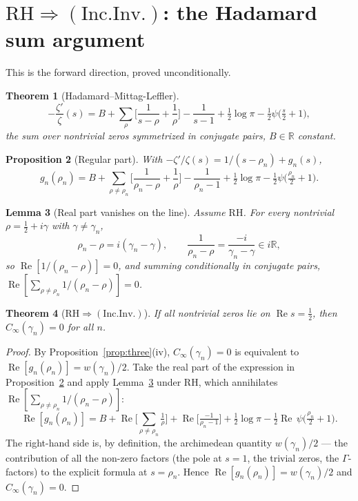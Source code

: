 \documentclass[11pt]{amsart}
\newtheorem{theorem}{Theorem}[section]
\newtheorem{proposition}[theorem]{Proposition}
\newtheorem{lemma}[theorem]{Lemma}
\theoremstyle{definition}
\theoremstyle{remark}
\newcommand{\RH}{\mathrm{RH}}
\renewcommand{\Re}{\operatorname{Re}}
\newcommand{\half}{\tfrac12}
\newcommand{\Cinf}{C_\infty}
\newcommand{\gamn}{\gamma_n}
\newcommand{\rhon}{\rho_n}
\newcommand{\incInv}{(\mathrm{Inc.Inv.})}
\newcommand{\psidig}{\psi}
\begin{document}
\section{$\RH\Rightarrow\incInv$: the Hadamard sum argument}\label{sec:hadamard}

This is the forward direction, proved unconditionally.

\begin{theorem}[Hadamard--Mittag-Leffler]\label{thm:had}
\[
-\frac{\zeta'}{\zeta}(s)=B+\sum_\rho\Big[\frac1{s-\rho}+\frac1\rho\Big]-\frac1{s-1}
+\tfrac12\log\pi-\tfrac12\psidig\!\big(\tfrac s2+1\big),
\]
the sum over nontrivial zeros symmetrized in conjugate pairs, $B\in\mathbb R$ constant.
\end{theorem}

\begin{proposition}[Regular part]\label{prop:reg}
With $-\zeta'/\zeta(s)=1/(s-\rhon)+g_n(s)$,
\[
g_n(\rhon)=B+\sum_{\rho\ne\rhon}\Big[\frac1{\rhon-\rho}+\frac1\rho\Big]-\frac1{\rhon-1}
+\tfrac12\log\pi-\tfrac12\psidig\!\big(\tfrac{\rhon}2+1\big).
\]
\end{proposition}

\begin{lemma}[Real part vanishes on the line]\label{lem:cancel}
Assume $\RH$. For every nontrivial $\rho=\half+i\gamma$ with $\gamma\ne\gamn$,
\[
\rhon-\rho=i(\gamn-\gamma),\qquad\frac1{\rhon-\rho}=\frac{-i}{\gamn-\gamma}\in i\mathbb R,
\]
so $\Re[1/(\rhon-\rho)]=0$, and summing conditionally in conjugate pairs,
$\Re[\sum_{\rho\ne\rhon}1/(\rhon-\rho)]=0$.
\end{lemma}

\begin{theorem}[$\RH\Rightarrow\incInv$]\label{thm:rh-implies-ii}
If all nontrivial zeros lie on $\Re s=\half$, then $\Cinf(\gamn)=0$ for all $n$.
\end{theorem}
\begin{proof}
By Proposition~\ref{prop:three}(iv), $\Cinf(\gamn)=0$ is equivalent to $\Re[g_n(\rhon)]=
w(\gamn)/2$. Take the real part of the expression in Proposition~\ref{prop:reg} and apply
Lemma~\ref{lem:cancel} under $\RH$, which annihilates $\Re[\sum_{\rho\ne\rhon}1/(\rhon-\rho)]$:
\[
\Re[g_n(\rhon)]=B+\Re\Big[\sum_{\rho\ne\rhon}\tfrac1\rho\Big]+\Re\Big[\tfrac{-1}{\rhon-1}\Big]
+\tfrac12\log\pi-\tfrac12\Re\,\psidig\!\big(\tfrac{\rhon}2+1\big).
\]
The right-hand side is, by definition, the archimedean quantity $w(\gamn)/2$ --- the
contribution of all the non-zero factors (the pole at $s=1$, the trivial zeros, the
$\Gamma$-factors) to the explicit formula at $s=\rhon$. Hence $\Re[g_n(\rhon)]=w(\gamn)/2$ and
$\Cinf(\gamn)=0$.
\end{proof}
\end{document}
